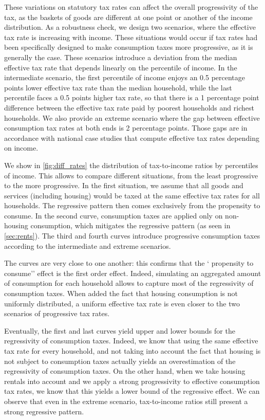 These variations on statutory tax rates can affect the overall progressivity of the tax, as the baskets of goods are different at one point or another of the income distribution. As a robustness check, we design two scenarios, where the effective tax rate is increasing with income. These situations would occur if tax rates had been specifically designed to make consumption taxes more progressive, as it is generally the case. These scenarios introduce a deviation from the median effective tax rate that depends linearly on the percentile of income. In the intermediate scenario, the first percentile of income enjoys an 0.5 percentage points lower effective tax rate than the median household, while the last percentile faces a 0.5 points higher tax rate, so that there is a 1 percentage point difference between the effective tax rate paid by poorest households and richest households. We also provide an extreme scenario where the gap between effective consumption tax rates at both ends is 2 percentage points. Those gaps are in accordance with national case studies that compute effective tax rates depending on income. %

We show in \cref{fig:diff_rates} the distribution of tax-to-income ratios by percentiles of income. This allows to compare different situations, from the least progressive to the more progressive. In the first situation, we assume that all goods and services (including housing) would be taxed at the same effective tax rates for all households. The regressive pattern then comes exclusively from the propensity to consume. In the second curve, consumption taxes are applied only on non-housing consumption, which mitigates the regressive pattern (as seen in \cref{sec:rents}). The third and fourth curves introduce progressive consumption taxes according to the intermediate and extreme scenarios.

The curves are very close to one another: this confirms that the ` propensity to consume'' effect is the first order effect. Indeed, simulating an aggregated amount of consumption for each household allows to capture most of the regressivity of consumption taxes. When added the fact that housing consumption is not uniformly distributed, a uniform effective tax rate is even closer to the two scenarios of progressive tax rates.

Eventually, the first and last curves yield upper and lower bounds for the regressivity of consumption taxes. Indeed, we know that using the same effective tax rate for every household, and not taking into account the fact that housing is not subject to consumption taxes actually yields an overestimation of the regressivity of consumption taxes. On the other hand, when we take housing rentals into account and we apply a strong progressivity to effective consumption tax rates, we know that this yields a lower bound of the regressive effect. We can observe that even in the extreme scenario, tax-to-income ratios still present a strong regressive pattern.

